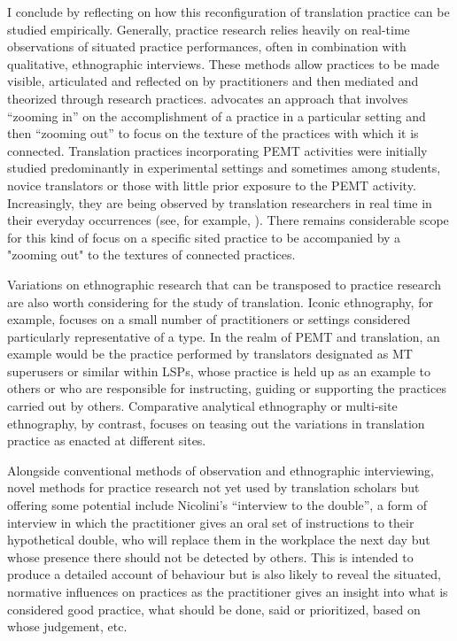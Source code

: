 \documentclass[output=paper,colorlinks,citecolor=brown]{langsci/langscibook}
\begin{document}
I conclude by reflecting on how this reconfiguration of translation practice can be studied empirically. Generally, practice research relies heavily on real-time observations of situated practice performances, often in combination with qualitative, ethnographic interviews. These methods allow practices to be made visible, articulated and reflected on by practitioners and then mediated and theorized through research practices. \citet{nicolini_zooming_2009} advocates an approach that involves \enquote{zooming in} on the accomplishment of a practice in a particular setting and then \enquote{zooming out} to focus on the texture of the practices with which it is connected. Translation practices incorporating PEMT activities were initially studied predominantly in experimental settings and sometimes among students, novice translators or those with little prior exposure to the PEMT activity. Increasingly, they are being observed by translation researchers in real time in their everyday occurrences (see, for example, \citealt{macken_quantifying_2020}). There remains considerable scope for this kind of focus on a specific sited practice to be accompanied by a "zooming out" to the textures of connected practices.


Variations on ethnographic research \citep[see][]{katz_becoming_2019} that can be transposed to practice research are also worth considering for the study of translation. Iconic ethnography, for example, focuses on a small number of practitioners or settings considered particularly representative of a type. In the realm of PEMT and translation, an example would be the practice performed by translators designated as MT superusers or similar within LSPs, whose practice is held up as an example to others or who are responsible for instructing, guiding or supporting the practices carried out by others. Comparative analytical ethnography or multi-site ethnography, by contrast, focuses on teasing out the variations in translation practice as enacted at different sites. 

Alongside conventional methods of observation and ethnographic interviewing, novel methods for practice research not yet used by translation scholars but offering some potential include Nicolini’s \citeyearpar{nicolini_articulating_2009} \enquote{interview to the double}, a form of interview in which the practitioner gives an oral set of instructions to their hypothetical double, who will replace them in the workplace the next day but whose presence there should not be detected by others. This is intended to produce a detailed account of behaviour but is also likely to reveal the situated, normative influences on practices as the practitioner gives an insight into what is considered good practice, what should be done, said or prioritized, based on whose judgement, etc.
\end{document}
